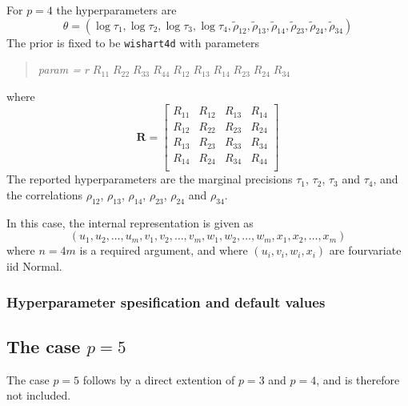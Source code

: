 \documentclass[a4paper,11pt]{article}
\begin{document}
For $p=4$ the
hyperparameters are
\begin{displaymath}
    \theta = (\log \tau_{1}, \log \tau_{2}, \log \tau_{3}, \log \tau_{4},
    \tilde\rho_{12},
    \tilde\rho_{13},
    \tilde\rho_{14},
    \tilde\rho_{23},
    \tilde\rho_{24},
    \tilde\rho_{34})
\end{displaymath}
The prior is fixed to be \texttt{wishart4d} with parameters
\begin{quote}
    \emph{param = } $r\;R_{11}\;R_{22}\;R_{33}\; R_{44}\;
    R_{12}\;
    R_{13}\;
    R_{14}\;
    R_{23}\;
    R_{24}\;
    R_{34}$
\end{quote}
where
\begin{displaymath}
    \mathbf{R} =
    \left[\begin{array}{cccc}
        R_{11} &R_{12} & R_{13} & R_{14}\\
        R_{12} & R_{22} & R_{23} & R_{24}\\
        R_{13} & R_{23} & R_{33} & R_{34}\\
        R_{14} & R_{24} & R_{34} & R_{44}\\
    \end{array}\right]
\end{displaymath}
The reported hyperparameters are the marginal precisions $\tau_{1}$,
$\tau_{2}$, $\tau_{3}$ and $\tau_{4}$, and the correlations
$\rho_{12}$, $\rho_{13}$, $\rho_{14}$, $\rho_{23}$, $\rho_{24}$ and
$\rho_{34}$.

In this case, the internal representation is given as
\begin{displaymath}
    (u_{1}, u_{2}, \ldots, u_{m}, v_{1}, v_{2}, \ldots, v_{m},
    w_{1}, w_{2}, \ldots, w_{m},
    x_{1}, x_{2}, \ldots, x_{m})
\end{displaymath}
where $n=4m$ is a required argument, and where $(u_{i}, v_{i}, w_{i}, x_{i})$
are fourvariate iid Normal.

\subsubsection*{Hyperparameter spesification and default values}



\subsection*{The case $p=5$}

The case $p=5$ follows by a direct extention of $p=3$ and $p=4$, and
is therefore not included.
\end{document}
